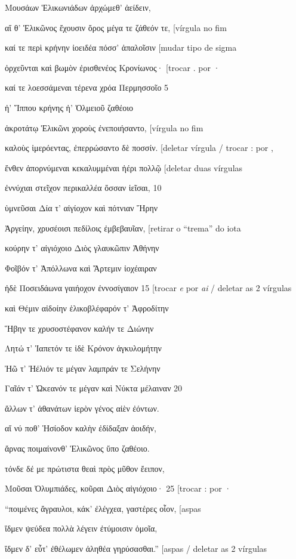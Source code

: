Μουσάων Ἑλικωνιάδων ἀρχώμεθ' ἀείδειν,

αἵ θ' Ἑλικῶνος ἔχουσιν ὄρος μέγα τε ζάθεόν τε, {[}vírgula no fim

καί τε περὶ κρήνην ἰοειδέα πόσσ' ἁπαλοῖσιν {[}mudar tipo de sigma

ὀρχεῦνται καὶ βωμὸν ἐρισθενέος Κρονίωνος· {[}trocar . por ·

καί τε λοεσσάμεναι τέρενα χρόα Περμησσοῖο 5

ἠ' Ἵππου κρήνης ἠ' Ὀλμειοῦ ζαθέοιο

ἀκροτάτῳ Ἑλικῶνι χοροὺς ἐνεποιήσαντο, {[}vírgula no fim

καλοὺς ἱμερόεντας, ἐπερρώσαντο δὲ ποσσίν. {[}deletar vírgula / trocar :
por ,

ἔνθεν ἀπορνύμεναι κεκαλυμμέναι ἠέρι πολλῷ {[}deletar duas vírgulas

ἐννύχιαι στεῖχον περικαλλέα ὄσσαν ἱεῖσαι, 10

ὑμνεῦσαι Δία τ' αἰγίοχον καὶ πότνιαν Ἥρην

Ἀργείην, χρυσέοισι πεδίλοις ἐμβεβαυῖαν, {[}retirar o ``trema'' do iota

κούρην τ' αἰγιόχοιο Διὸς γλαυκῶπιν Ἀθήνην

Φοῖβόν τ' Ἀπόλλωνα καὶ Ἄρτεμιν ἰοχέαιραν

ἠδὲ Ποσειδάωνα γαιήοχον ἐννοσίγαιον 15 {[}trocar \emph{e} por \emph{ai}
/ deletar as 2 vírgulas

καὶ Θέμιν αἰδοίην ἑλικοβλέφαρόν τ' Ἀφροδίτην

Ἥβην τε χρυσοστέφανον καλήν τε Διώνην

Λητώ τ' Ἰαπετόν τε ἰδὲ Κρόνον ἀγκυλομήτην

Ἠῶ τ' Ἠέλιόν τε μέγαν λαμπράν τε Σελήνην

Γαῖάν τ' Ὠκεανόν τε μέγαν καὶ Νύκτα μέλαιναν 20

ἄλλων τ' ἀθανάτων ἱερὸν γένος αἰὲν ἐόντων.

αἵ νύ ποθ' Ἡσίοδον καλὴν ἐδίδαξαν ἀοιδήν,

ἄρνας ποιμαίνονθ' Ἑλικῶνος ὕπο ζαθέοιο.

τόνδε δέ με πρώτιστα θεαὶ πρὸς μῦθον ἔειπον,

Μοῦσαι Ὀλυμπιάδες, κοῦραι Διὸς αἰγιόχοιο· 25 {[}trocar : por ·

``ποιμένες ἄγραυλοι, κάκ' ἐλέγχεα, γαστέρες οἶον, {[}aspas

ἴδμεν ψεύδεα πολλὰ λέγειν ἐτύμοισιν ὁμοῖα,

ἴδμεν δ' εὖτ' ἐθέλωμεν ἀληθέα γηρύσασθαι.'' {[}aspas / deletar as 2
vírgulas

